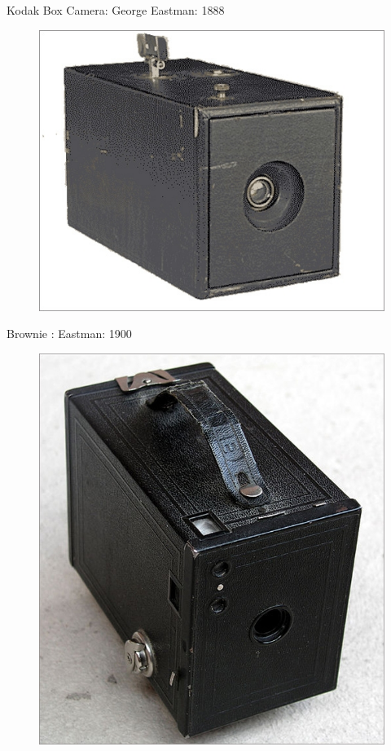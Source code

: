 \documentclass{beamer}
\begin{document}
	\begin{frame}{Kodak Box Camera: George Eastman: 1888}
		\begin{figure}
			\centering
			\includegraphics[scale=0.4]{126.jpg}
		\end{figure}
	\end{frame}

	\begin{frame}{Brownie : Eastman: 1900}
		\begin{figure}
			\centering
			\includegraphics[scale=0.3]{127.jpg}
		\end{figure}
	\end{frame}
\end{document}
